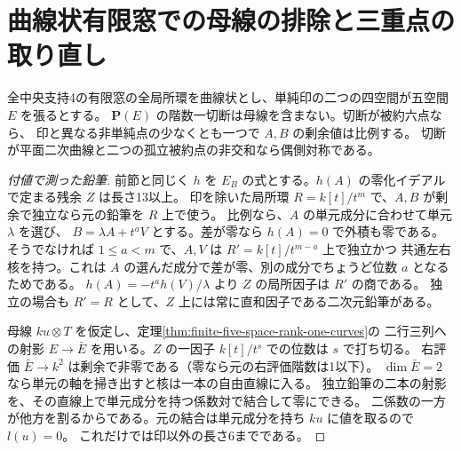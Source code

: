 \section{曲線状有限窓での母線の排除と三重点の取り直し}
\label{sec:finite-curvilinear-pencils}
\begin{proposition}\label{prop:curvilinear-marked-pencils}
全中央支持4の有限窓の全局所環を曲線状とし、単純印の二つの四空間が五空間 $E$ を張るとする。
$\mathbf P(E)$ の階数一切断は母線を含まない。切断が被約六点なら、
印と異なる非単純点の少なくとも一つで $A,B$ の剰余値は比例する。
切断が平面二次曲線と二つの孤立被約点の非交和なら偶側対称である。
\end{proposition}
\begin{proof}[付値で測った鉛筆]
前節と同じく $h$ を $E_B$ の式とする。$h(A)$ の零化イデアルで定まる残余 $Z$ は長さ13以上。
印を除いた局所環 $R=k[t]/t^m$ で、$A,B$ が剰余で独立なら元の鉛筆を $R$ 上で使う。
比例なら、$A$ の単元成分に合わせて単元 $\lambda$ を選び、
$B=\lambda A+t^a V$ とする。差が零なら $h(A)=0$ で外積も零である。
そうでなければ $1\le a<m$ で、$A,V$ は $R'=k[t]/t^{m-a}$ 上で独立かつ
共通左右核を持つ。これは $A$ の選んだ成分で差が零、別の成分でちょうど位数 $a$ となるためである。
$h(A)=-t^a h(V)/\lambda$ より $Z$ の局所因子は $R'$ の商である。
独立の場合も $R'=R$ として、$Z$ 上には常に直和因子である二次元鉛筆がある。

母線 $ku\otimes T$ を仮定し、定理\ref{thm:finite-five-space-rank-one-curves}の
二行三列への射影 $E\to\bar E$ を用いる。$Z$ の一因子 $k[t]/t^s$ での位数は $s$ で打ち切る。
右評価 $\bar E\to k^2$ は剰余で非零である（零なら元の右評価階数は1以下）。
$\dim\bar E=2$ なら単元の軸を掃き出すと核は一本の自由直線に入る。
独立鉛筆の二本の射影を、その直線上で単元成分を持つ係数対で結合して零にできる。
二係数の一方が他方を割るからである。元の結合は単元成分を持ち $ku$ に値を取るので $l(u)=0$。
これだけでは印以外の長さ6までである。


\end{proof}
